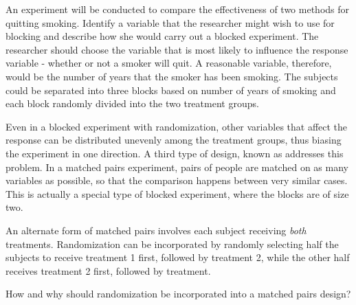 \begin{examplewrap}
\begin{nexample}{An experiment will be conducted to compare the effectiveness of two methods for quitting smoking. Identify a variable that the researcher might wish to use for blocking and describe how she would carry out a blocked experiment.}
The researcher should choose the variable that is most likely to influence the response variable - whether or not a smoker will quit. A reasonable variable, therefore, would be the number of years that the smoker has been smoking. The subjects could be separated into three blocks based on number of years of smoking and each block randomly divided into the two treatment groups.
\end{nexample}
\end{examplewrap}

Even in a blocked experiment with randomization, other variables that affect the response can be distributed unevenly among the treatment groups, thus biasing the experiment in one direction. A third type of design, known as  addresses this problem. In a matched pairs experiment, pairs of people are matched on as many variables as possible, so that the comparison happens between very similar cases. This is actually a special type of blocked experiment, where the blocks are of size two.


An alternate form of matched pairs involves each subject receiving \emph{both} treatments. Randomization can be incorporated by randomly selecting half the subjects to receive treatment 1 first, followed by treatment 2, while the other half receives treatment 2 first, followed by treatment.

\begin{exercisewrap}
\begin{nexercise}
How and why should randomization be incorporated into a matched pairs design?\footnotemark
\end{nexercise}
\end{exercisewrap}

